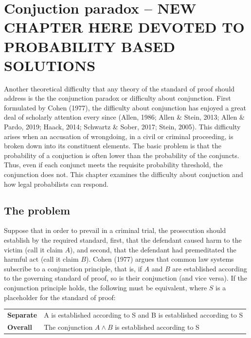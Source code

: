 \documentclass[10pt,dvipsnames,enabledeprecatedfontcommands]{scrartcl}
\newcommand{\et}{\wedge}
\begin{document}
\hypertarget{conjuction-paradox-new-chapter-here-devoted-to-probability-based-solutions}{%
\section{Conjuction paradox -- NEW CHAPTER HERE DEVOTED TO PROBABILITY
BASED
SOLUTIONS}\label{conjuction-paradox-new-chapter-here-devoted-to-probability-based-solutions}}

Another theoretical difficulty that any theory of the standard of proof
should address is the the conjunction paradox or difficulty about
conjunction. First formulated by Cohen (1977), the difficulty about
conjunction has enjoyed a great deal of scholarly attention every since
(Allen, 1986; Allen \& Stein, 2013; Allen \& Pardo, 2019; Haack, 2014;
Schwartz \& Sober, 2017; Stein, 2005). This difficulty arises when an
accusation of wrongdoing, in a civil or criminal proceeding, is broken
down into its constituent elements. The basic problem is that the
probability of a conjuction is often lower than the probability of the
conjuncts. Thus, even if each conjunct meets the requisite probability
threshold, the conjunction does not. This chapter examines the
difficulty about conjuction and how legal probabilists can respond.

\hypertarget{the-problem}{%
\subsection{The problem}\label{the-problem}}

Suppose that in order to prevail in a criminal trial, the prosecution
should establish by the required standard, first, that the defendant
caused harm to the victim (call it claim \(A\)), and second, that the
defendant had premeditated the harmful act (call it claim \(B\)). Cohen
(1977) argues that common law systems subscribe to a conjunction
principle, that is, if \(A\) and \(B\) are established according to the
governing standard of proof, so is their conjunction (and vice versa).
If the conjunction principle holds, the following must be equivalent,
where \(S\) is a placeholder for the standard of proof:

\begin{center}
\begin{tabular}
{@{}ll@{}}
\toprule
\textbf{Separate} &   A is established according to S and B is established according to S\\   
\textbf{Overall}  &   The conjunction $A \et B$ is established according to S  \\ 
\bottomrule
\end{tabular}
\end{center}
\end{document}
